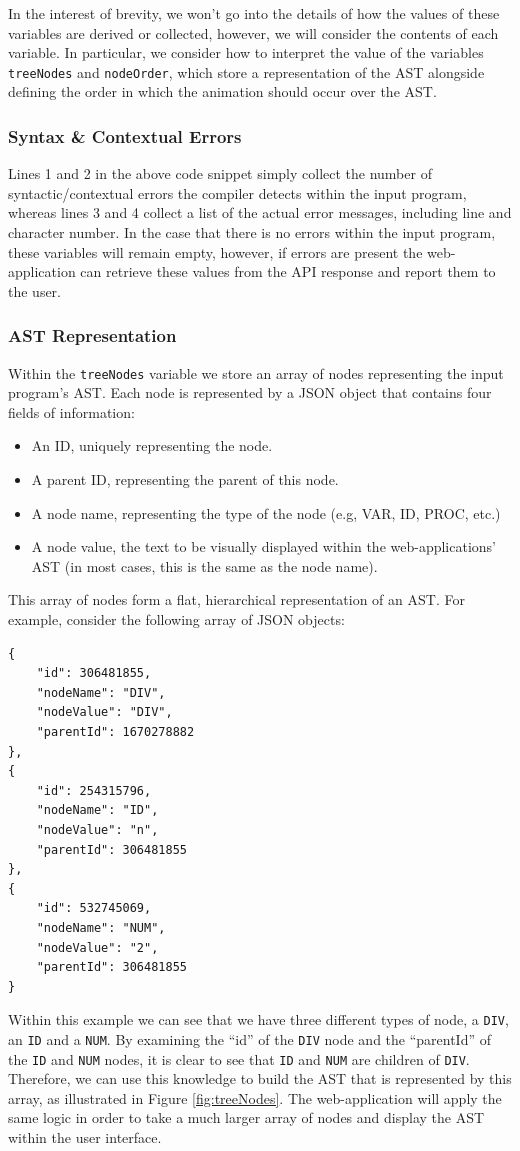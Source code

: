 \documentclass{l4proj}
\begin{document}
In the interest of brevity, we won't go into the details of how the values of these variables are derived or collected, however, we will consider the contents of each variable. In particular, we consider how to interpret the value of the variables \texttt{treeNodes} and \texttt{nodeOrder}, which store a representation of the AST alongside defining the order in which the animation should occur over the AST.

\subsubsection{Syntax \& Contextual Errors}
Lines 1 and 2 in the above code snippet simply collect the number of syntactic/contextual errors the compiler detects within the input program, whereas lines 3 and 4 collect a list of the actual error messages, including line and character number. In the case that there is no errors within the input program, these variables will remain empty, however, if errors are present the web-application can retrieve these values from the API response and report them to the user.

\subsubsection{AST Representation}
Within the \texttt{treeNodes} variable we store an array of nodes representing the input program's AST. Each node is represented by a JSON object that contains four fields of information:
\begin{itemize}
\item An ID, uniquely representing the node.
\item A parent ID, representing the parent of this node.
\item A node name, representing the type of the node (e.g, VAR, ID, PROC, etc.)
\item A node value, the text to be visually displayed within the web-applications' AST (in most cases, this is the same as the node name).
\end{itemize}
This array of nodes form a flat, hierarchical representation of an AST. For example, consider the following array of JSON objects:
\begin{lstlisting}
{
    "id": 306481855,
    "nodeName": "DIV",
    "nodeValue": "DIV",
    "parentId": 1670278882
},
{
    "id": 254315796,
    "nodeName": "ID",
    "nodeValue": "n",
    "parentId": 306481855
},
{
    "id": 532745069,
    "nodeName": "NUM",
    "nodeValue": "2",
    "parentId": 306481855
}
\end{lstlisting}
Within this example we can see that we have three different types of node, a \texttt{DIV}, an \texttt{ID} and a \texttt{NUM}. By examining the ``id'' of the \texttt{DIV} node and the ``parentId'' of the \texttt{ID} and \texttt{NUM} nodes, it is clear to see that \texttt{ID} and \texttt{NUM} are children of \texttt{DIV}. Therefore, we can use this knowledge to build the AST that is represented by this array, as illustrated in Figure \ref{fig:treeNodes}. The web-application will apply the same logic in order to take a much larger array of nodes and display the AST within the user interface.
\end{document}
